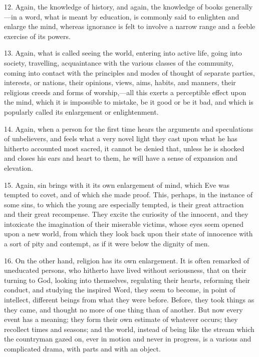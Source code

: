 12. Again, the knowledge of history, and again, the knowledge of
books generally—in a word, what is meant by education, is commonly
said to enlighten and enlarge the mind, whereas ignorance is felt to
involve a narrow range and a feeble exercise of its powers.

13. Again, what is called seeing the world, entering into active
life, going into society, travelling, acquaintance with the various
classes of the community, coming into contact with the principles and
modes of thought of separate parties, interests, or nations, their
opinions, views, aims, habits, and manners, their religious creeds and
forms of worship,—all this exerts a perceptible effect upon the
mind, which it is impossible to mistake, be it good or be it bad, and
which is popularly called its enlargement or enlightenment.

14. Again, when a person for the first time hears the arguments and
speculations of unbelievers, and feels what a very novel light they
cast upon what he has hitherto accounted most sacred, it cannot be
denied that, unless he is shocked and closes his ears and heart to
them, he will have a sense of expansion and elevation.

15. Again, sin brings with it its own enlargement of mind, which
Eve was tempted to covet, and of which she made proof. This, perhaps,
in the instance of some sins, to which the young are especially
tempted, is their great attraction and their great recompense. They
excite the curiosity of the innocent, and they intoxicate the
imagination of their miserable victims, whose eyes seem opened upon a
new world, from which they look back upon their state of innocence
with a sort of pity and contempt, as if it were below the dignity of
men.

16. On the other hand, religion has its own enlargement. It is
often remarked of uneducated persons, who hitherto have lived without
seriousness, that on their turning to God, looking into themselves,
regulating their hearts, reforming their conduct, and studying the
inspired Word, they seem to become, in point of intellect, different
beings from what they were before. Before, they took things as they
came, and thought no more of one thing than of another. But now every
event has a meaning; they form their own estimate of whatever occurs;
they recollect times and seasons; and the world, instead of being like
the stream which the countryman gazed on, ever in motion and never in
progress, is a various and complicated drama, with parts and with an
object.


